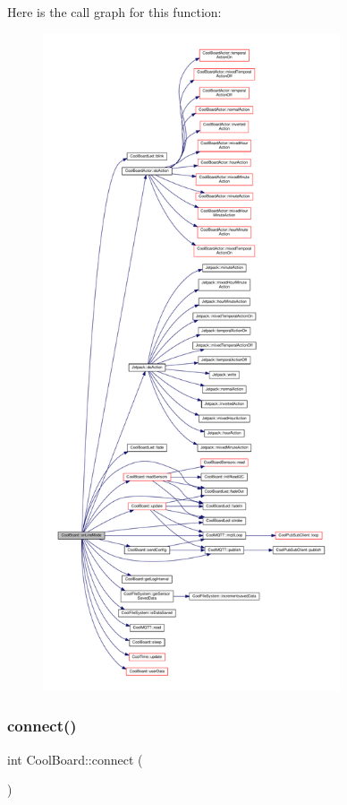 Here is the call graph for this function\+:\nopagebreak
\begin{figure}[H]
\begin{center}
\leavevmode
\includegraphics[height=550pt]{d7/df9/class_cool_board_aa0bbc4bc605e35618d18e68795c61363_cgraph}
\end{center}
\end{figure}
\mbox{\label{class_cool_board_a519de78b807f8ec6463ff484eb925918}} 
\subsubsection{\texorpdfstring{connect()}{connect()}}
{\footnotesize\ttfamily int Cool\+Board\+::connect (\begin{DoxyParamCaption}{ }\end{DoxyParamCaption})}

